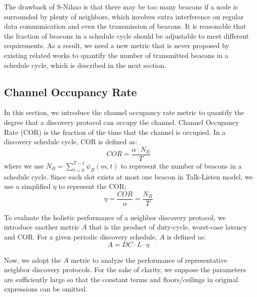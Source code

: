 \documentclass[conference]{IEEEtran}
\begin{document}
The drawback of S-Nihao is that there may be too many beacons if a node is surrounded by plenty of neighbors, which involves extra interference on regular data communication and even the transmission of beacons.
It is reasonable that the fraction of beacons in a schedule cycle should be adjustable to meet different requirements.
As a result, we need a new metric that is never proposed by existing related works to quantify the number of transmitted beacons in a schedule cycle,
which is described in the next section.

\subsection{Channel Occupancy Rate}\label{channeloccupancy}
In this section, we introduce the channel occupancy rate metric to quantify the degree that a discovery protocol can occupy the channel.
Channel Occupancy Rate (COR) is the fraction of the time that the channel is occupied.
In a discovery schedule cycle, COR is defined as:
\begin{displaymath}
    COR = \frac{\alpha \cdot N_B}{T}
\end{displaymath}
where we use $N_B=\sum_{t=0}^{T-1} \psi_B(m,t)$ to represent the number of beacons in a schedule cycle.
Since each slot exists at most one beacon in Talk-Listen model, we use a simplified $\eta$ to represent the COR:
\begin{displaymath}
    \eta = \frac{COR}{\alpha} = \frac{N_B}{T}
\end{displaymath}

To evaluate the holistic performance of a neighbor discovery protocol,
we introduce another metric $A$ that is the product of duty-cycle, worst-case latency and COR.
For a given periodic discovery schedule, $A$ is defined as:
\begin{displaymath}
    A = DC \cdot L \cdot \eta 
\end{displaymath}

Now, we adopt the $A$ metric to analyze the performance of representative neighbor discovery protocols.
For the sake of clarity, we suppose the parameters are sufficiently large
so that the constant terms and floors/ceilings in original expressions can be omitted.
\end{document}
